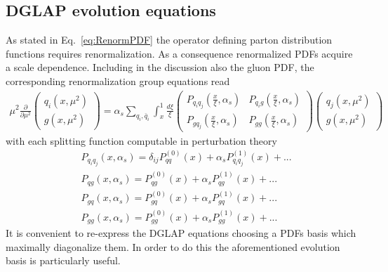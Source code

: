 \subsection{DGLAP evolution equations}
\label{sec:DGLAP}
As stated in Eq.~\eqref{eq:RenormPDF} the operator defining parton distribution functions requires
renormalization. As a consequence renormalized PDFs acquire a scale dependence.
Including in the discussion also the gluon PDF, the corresponding renormalization group equations read
\begin{align}
    \mu^2\frac{\partial}{\partial\mu^2}
    \begin{pmatrix}
        q_i\left(x,\mu^2\right) \\  
        g\left(x,\mu^2\right)
    \end{pmatrix}
    =
    \alpha_s\sum_{q_i,\bar{q}_i}\int_x^1 \frac{d\xi}{\xi} 
    \begin{pmatrix}
        P_{q_i q_j}\left(\frac{x}{\xi},\alpha_s\right) & P_{q_i g}\left(\frac{x}{\xi},\alpha_s\right) \\
        P_{g q_j}\left(\frac{x}{\xi},\alpha_s\right)   & P_{g g}\left(\frac{x}{\xi},\alpha_s\right) 
    \end{pmatrix}
    \begin{pmatrix}
        q_j\left(x,\mu^2\right) \\  
        g\left(x,\mu^2\right)
    \end{pmatrix}
\end{align}
with each splitting function computable in perturbation theory
\begin{equation}
    \begin{split}
    &P_{q_i q_j}\left(x,\alpha_s\right) = \delta_{ij}P^{(0)}_{qq}\left(x\right) 
    + \alpha_s P^{(1)}_{q_i q_j}\left(x\right) + ... \\
    &P_{q g}\left(x,\alpha_s\right) = P^{(0)}_{qg}\left(x\right) 
    + \alpha_s P^{(1)}_{q g}\left(x\right) + ... \\
    &P_{g q}\left(x,\alpha_s\right) = P^{(0)}_{gq}\left(x\right) 
    + \alpha_s P^{(1)}_{gq}\left(x\right) + ... \\
    &P_{g g}\left(x,\alpha_s\right) = P^{(0)}_{gg}\left(x\right) 
    + \alpha_s P^{(1)}_{gg}\left(x\right) + ... 
    \end{split}
\end{equation}
It is convenient to re-express the DGLAP equations choosing a PDFs basis which maximally diagonalize them. 
In order to do this the aforementioned evolution basis is particularly useful.
